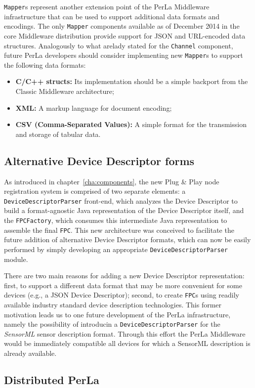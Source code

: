 \texttt{Mapper}s represent another extension point of the PerLa Middleware
infrastructure that can be used to support additional data formats and
encodings. The only \texttt{Mapper} components available as of December 2014
in the core Middleware distribution provide support for JSON and URL-encoded
data structures. Analogously to what arelady stated for the \texttt{Channel}
component, future PerLa developers should consider implementing new
\texttt{Mapper}s to support the following data formats:

\begin{itemize}

    \item \textbf{C/C++ structs:} Its implementation should be a simple
    backport from the Classic Middleware architecture;

    \item \textbf{XML:} A markup language for document encoding;

    \item \textbf{CSV (Comma-Separated Values):} A simple format for the
    transmission and storage of tabular data.

\end{itemize}

\subsection{Alternative Device Descriptor forms}

As introduced in chapter~\ref{cha:components}, the new Plug \& Play node
registration system is comprised of two separate elements: a
\texttt{DeviceDescriptorParser} front-end, which analyzes the Device Descriptor
to build a format-agnostic Java representation of the Device Descriptor itself,
and the \texttt{FPCFactory}, which consumes this intermediate Java
representation to assemble the final \texttt{FPC}. This new architecture was
conceived to facilitate the future addition of alternative Device Descriptor
formats, which can now be easily performed by simply developing an appropriate
\texttt{DeviceDescriptorParser} module.

There are two main reasons for adding a new Device Descriptor representation:
first, to support a different data format that may be more convenient for some
devices (e.g., a JSON Device Descriptor); second, to create \texttt{FPC}s using
readily available industry standard device description technologies. This
former motivation leads us to one future development of the PerLa
infrastructure, namely the possibility of introducin a
\texttt{DeviceDescriptorParser} for the \textit{SensorML} \cite{sensorml}
sensor description format. Through this effort the PerLa Middleware would be
immediately compatible all devices for which a SensorML description is already
available.

\subsection{Distributed PerLa}
